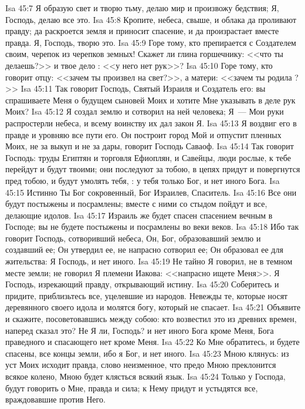 \vs Isa 45:7 Я образую свет и творю тьму, делаю мир и произвожу бедствия; Я, Господь, делаю все это.
\vs Isa 45:8 Кропите, небеса, свыше, и облака да проливают правду; да раскроется земля и приносит спасение, и да произрастает вместе правда. Я, Господь, творю это.
\vs Isa 45:9 Горе тому, кто препирается с Создателем своим, черепок из черепков земных! Скажет ли глина горшечнику: <<что ты делаешь?>> и твое дело : <<у него нет рук>>?
\vs Isa 45:10 Горе тому, кто говорит отцу: <<зачем ты произвел  на свет?>>, а матери: <<зачем ты родила ?>>
\vs Isa 45:11 Так говорит Господь, Святый Израиля и Создатель его: вы спрашиваете Меня о будущем сыновей Моих и хотите Мне указывать в деле рук Моих?
\vs Isa 45:12 Я создал землю и сотворил на ней человека; Я~--- Мои руки распростерли небеса, и всему воинству их дал закон Я.
\vs Isa 45:13 Я воздвиг его в правде и уровняю все пути его. Он построит город Мой и отпустит пленных Моих, не за выкуп и не за дары, говорит Господь Саваоф.
\rsbpar\vs Isa 45:14 Так говорит Господь: труды Египтян и торговля Ефиоплян, и Савейцы, люди рослые, к тебе перейдут и будут твоими; они последуют за тобою, в цепях придут и повергнутся пред тобою, и будут умолять тебя, : у тебя только Бог, и нет иного Бога.
\vs Isa 45:15 Истинно Ты Бог сокровенный, Бог Израилев, Спаситель.
\vs Isa 45:16 Все они будут постыжены и посрамлены; вместе с ними со стыдом пойдут и все, делающие идолов.
\vs Isa 45:17 Израиль же будет спасен спасением вечным в Господе; вы не будете постыжены и посрамлены во веки веков.
\vs Isa 45:18 Ибо так говорит Господь, сотворивший небеса, Он, Бог, образовавший землю и создавший ее; Он утвердил ее, не напрасно сотворил ее; Он образовал ее для жительства: Я Господь, и нет иного.
\vs Isa 45:19 Не тайно Я говорил, не в темном месте земли; не говорил Я племени Иакова: <<напрасно ищете Меня>>. Я Господь, изрекающий правду, открывающий истину.
\vs Isa 45:20 Соберитесь и придите, приблизьтесь все, уцелевшие из народов. Невежды те, которые носят деревянного своего идола и молятся богу, который не спасает.
\vs Isa 45:21 Объявите и скажите, посоветовавшись между собою: кто возвестил это из древних времен, наперед сказал это? Не Я ли, Господь? и нет иного Бога кроме Меня, Бога праведного и спасающего нет кроме Меня.
\vs Isa 45:22 Ко Мне обратитесь, и будете спасены, все концы земли, ибо я Бог, и нет иного.
\vs Isa 45:23 Мною клянусь: из уст Моих исходит правда, слово неизменное, что предо Мною преклонится всякое колено, Мною будет клясться всякий язык.
\vs Isa 45:24 Только у Господа, будут говорить о Мне, правда и сила; к Нему придут и устыдятся все, враждовавшие против Него.
